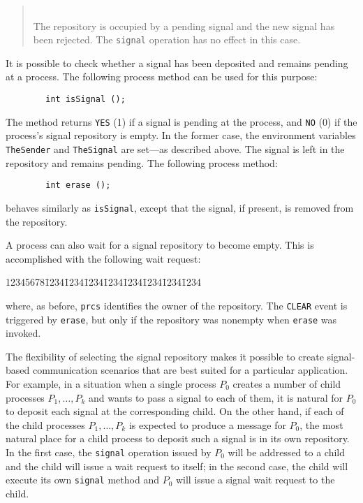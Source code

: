 \begin{quote}
\noindent{}\\ \hspace{0in}
The repository is occupied by a pending signal and the new signal has been
rejected.
The {\tt signal} operation has no effect in this case.
\end{quote}\medskip

It is possible to check whether a signal has been deposited and remains
pending at a process.
The following process method can be used for this purpose:
\begin{verbatim}
        int isSignal ();
\end{verbatim}
The method returns {\tt YES} (1) if a signal is pending at the process,
and {\tt NO} (0) if the process's signal repository is empty.
In the former case, the environment variables {\tt TheSender} and
{\tt TheSignal} are set---as described above.
The signal is left in the repository and remains pending.
The following process method:
\begin{verbatim}
        int erase ();
\end{verbatim}
behaves similarly as {\tt isSignal}, except that the signal, if present, is
removed from the repository.

A process can also wait for a signal repository to become empty.
This is accomplished with the following wait request:
{\tt\begin{tabbing}
12345678\=1234\=1234\=1234\=1234\=1234\=1234\=1234\=1234\kill
{}
\end{tabbing}}
\noindent
where, as before, {\tt prcs} identifies the owner of the repository.
The {\tt CLEAR} event is triggered by {\tt erase}, but only if
the repository was nonempty when {\tt erase} was invoked.

\medskip

The flexibility of selecting the signal repository makes it possible to
create signal-based communication scenarios that are best suited for
a particular application.
For example, in a situation when a single
process $P_0$ creates a number of
child processes $P_1, \ldots, P_k$ and
wants to pass a signal to each of them, it is natural for $P_0$ to deposit each signal at the corresponding child.
On the other hand, if each of
the child processes $P_1, \ldots, P_k$ is expected to 
produce a message for $P_0$, the most natural place for a
child process to deposit such a signal is in its own repository.
In the first case, the {\tt signal} operation
issued by $P_0$ will be
addressed to a child and the child will issue a wait request to itself;
in the second case, the child will execute its own {\tt signal} method
and $P_0$ will issue a signal wait request to the child.

